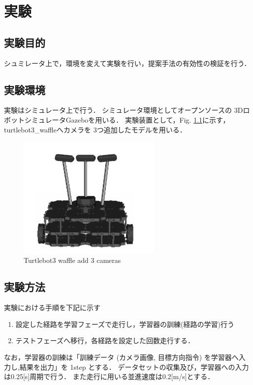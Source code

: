 \chapter{実験}
\section{実験目的}
シュミレータ上で，環境を変えて実験を行い，提案手法の有効性の検証を行う．
\section{実験環境}
実験はシミュレータ上で行う．
シミュレータ環境としてオープンソースの
3DロボットシミュレータGazebo\cite{gazebo:online}を用いる．
実験装置として，Fig. \ref{fig::turtlebot3}に示す，turtlebot3\_waffle\cite{turtlebot3:online}へカメラを
3つ追加したモデルを用いる．

\begin{figure}[H]
    \centering
    \includegraphics[width = 7cm]{./figs/3_camera.png}
    \caption{Turtlebot3 waffle add 3 cameras}
    \label{fig::turtlebot3}
\end{figure}

\section{実験方法}

実験における手順を下記に示す
\begin{enumerate}
  \item 設定した経路を学習フェーズで走行し，学習器の訓練(経路の学習)行う
  \item テストフェーズへ移行，各経路を設定した回数走行する．
\end{enumerate}
なお，学習器の訓練は「訓練データ (カメラ画像, 目標方向指令) を学習器へ入力し,結果を出力」を 1step とする．
データセットの収集及び，学習器への入力は0.25[s]周期で行う．
また走行に用いる並進速度は0.2[m/s]とする．

